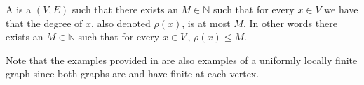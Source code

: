 \documentclass[12pt]{article}
\begin{document}
A  is a  $ (V,E) $ such that there exists an $ M \in \mathbb{N} $ such that for every $ x \in V $ we have that the degree of $ x $, also denoted $ \rho(x) $, is at most $ M $.  In other words there exists an $ M \in \mathbb{N} $ such that for every $ x \in V \, , \, \rho(x) \le M $.  

Note that the examples provided in  are also examples of a uniformly locally finite graph since both graphs are  and have finite  at each vertex.
\end{document}
